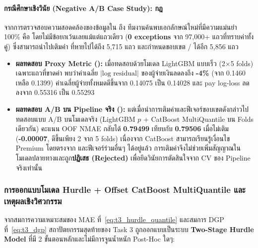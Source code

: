 \paragraph{กรณีศึกษาเชิงวินัย (Negative A/B Case Study): กฎ }
จากการตรวจสอบความสอดคล้องของข้อมูลใน  ถึง  ทีมงานค้นพบเอกลักษณ์ใหม่ที่มีความแม่นยำ 100\% คือ  โดยไม่มีข้อยกเว้นเลยแม้แต่แถวเดียว (\textbf{0 exceptions} จาก 97,000+ แถวที่ทราบค่าทั้งคู่) ซึ่งสามารถนำไปเติมค่า  ที่หายไปได้ถึง 5,715 แถว และกำหนดขอบเขต / ได้อีก 5,856 แถว
\begin{itemize}
    \item \textbf{ผลทดสอบ Proxy Metric ():} เมื่อทดสอบด้วยโมเดล LightGBM แบบเร็ว (2$\times$5 folds) เฉพาะแถวที่ขาดค่า  พบว่าค่าเฉลี่ย $|\text{log residual}|$ ของผู้จ่ายเงินลดลงถึง \textbf{-4\%} (จาก 0.1460 เหลือ 0.1399) ค่าเฉลี่ยผู้จ่ายทั้งหมดดีขึ้นจาก 0.14075 เป็น 0.14028 และ pay log-loss ลดลงจาก 0.55316 เป็น 0.55293
    \item \textbf{ผลทดสอบ A/B บน Pipeline จริง ():} แต่เมื่อนำการเติมค่าและฟีเจอร์ขอบเขตดังกล่าวไปทดสอบแบบ A/B บนโมเดลจริง (LightGBM $p$ + CatBoost  MultiQuantile บน Folds เดียวกัน) คะแนน OOF NMAE กลับได้ \textbf{0.79499} เทียบกับ \textbf{0.79506} เมื่อไม่เติม (\textbf{-0.00007}, ดีขึ้นเพียง 2 จาก 5 folds) เนื่องจาก CatBoost สามารถเรียนรู้เงื่อนไข Premium โดยตรงจาก  และฟีเจอร์ร่วมอื่นๆ ได้อยู่แล้ว การเติมค่าจึงไม่ช่วยเพิ่มสัญญาณในโมเดลปลายทางและถูก\textbf{ปฏิเสธ (Rejected)} เพื่อยึดวินัยการตัดสินใจจาก CV ของ Pipeline จริงเท่านั้น
\end{itemize}

\subsubsection{การออกแบบโมเดล Hurdle + Offset CatBoost MultiQuantile และเหตุผลเชิงวิศวกรรม}
\label{subsubsec:t3_model_design}

จากสมการความเหมาะสมของ MAE ที่~\eqref{eq:t3_hurdle_quantile} และสมการ DGP ที่~\eqref{eq:t3_dgp} สถาปัตยกรรมสุดท้ายของ Task 3 ถูกออกแบบเป็นระบบ \textbf{Two-Stage Hurdle Model} ที่มี 2 ขั้นตอนหลักและไม่มีการจูนน้ำหนัก Post-Hoc ใดๆ:

